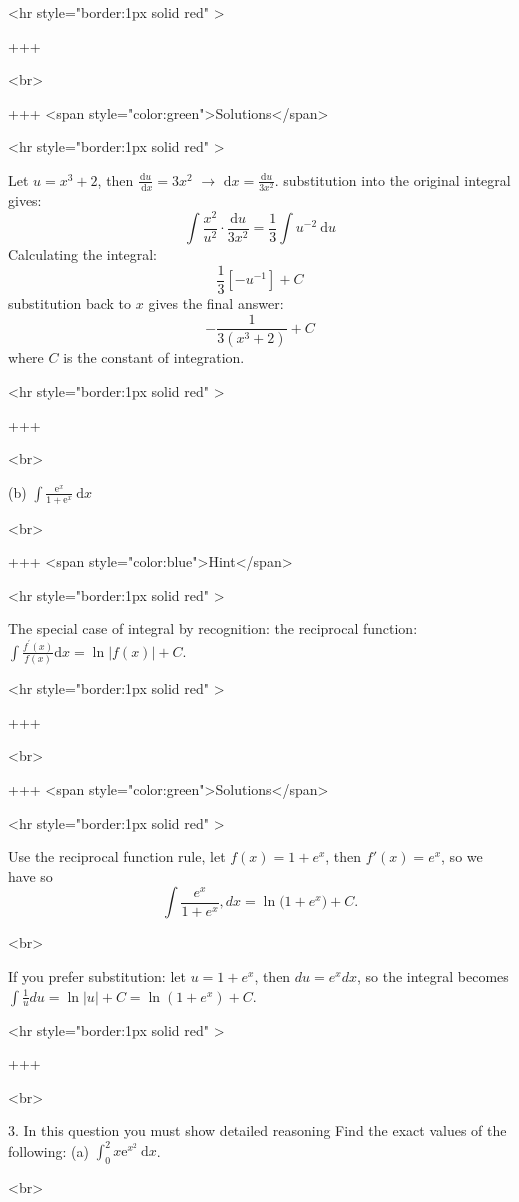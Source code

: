 <hr style="border:1px solid red" >

+++

<br>

+++ <span style="color:green">Solutions</span>

<hr style="border:1px solid red" >

Let $u=x^{3}+2$, then $\frac{\mathrm{d}{u}}{\mathrm{~d} x}=3 x^{2}$ $\rightarrow$ $\mathrm{d} x=\frac{\mathrm{d} u}{3 x^{2}}$. substitution into the original integral gives:
\[\int \frac{x^{2}}{u^{2}} \cdot \frac{\mathrm{d} u}{3 x^{2}}=\frac{1}{3} \int u^{-2} \mathrm{~d} u\]
Calculating the integral:
\[\frac{1}{3}\left[-u^{-1}\right]+C\]
substitution back to $x$ gives the final answer:
\[-\frac{1}{3\left(x^{3}+2\right)}+C\]
where $C$ is the constant of integration.

<hr style="border:1px solid red" >

+++

<br>

(b) $\int \frac{\mathrm{e}^{x}}{1+\mathrm{e}^{x}} \mathrm{~d} x$

<br>

+++ <span style="color:blue">Hint</span>

<hr style="border:1px solid red" >

The special case of integral by recognition: the reciprocal function: $\int \frac{f^{\prime}(x)}{f(x)} \mathrm{d} x=\ln |f(x)|+C$.

<hr style="border:1px solid red" >

+++

<br>

+++ <span style="color:green">Solutions</span>

<hr style="border:1px solid red" >

Use the reciprocal function rule, let $f(x)=1+e^x$, then $f'(x)=e^x$, so we have
so
$$
\int \frac{e^x}{1+e^x},dx=\ln\big(1+e^x\big)+C.
$$

<br>

If you prefer substitution: let $u=1+e^x$, then $du=e^x dx$, so the integral becomes $\int \frac{1}{u} du=\ln|u|+C=\ln(1+e^x)+C$.

<hr style="border:1px solid red" >

+++

<br>

3. In this question you must show detailed reasoning
Find the exact values of the following:
(a) $\int_{0}^{2} x \mathrm{e}^{x^{2}} \mathrm{~d} x$.

<br>

